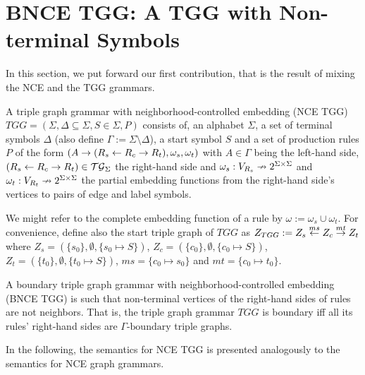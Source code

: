 \documentclass[runningheads]{llncs}
\begin{document}
\section{BNCE TGG: A TGG with Non-terminal Symbols}
\label{sec:bncetgg}
In this section, we put forward our first contribution, that is the result of mixing the NCE and the TGG grammars.

\begin{definition}
	A triple graph grammar with neighborhood-controlled embedding (NCE TGG) $TGG = (\Sigma, \Delta \subseteq \Sigma, S \in \Sigma, P)$ consists of, an alphabet $\Sigma$, a set of terminal symbols $\Delta$ (also define $\Gamma := \Sigma \setminus \Delta$), a start symbol $S$ and a set of production rules $P$ of the form $(A \to (R_s \overset{}{\leftarrow} R_c \overset{}{\rightarrow} R_t), \omega_s, \omega_t)$ with $A \in \Gamma$ being the left-hand side, $(R_s \overset{}{\leftarrow} R_c \overset{}{\rightarrow} R_t) \in \mathcal{TG}_{\Sigma}$ the right-hand side and $\omega_s : V_{R_s} \nrightarrow 2^{\Sigma \times \Sigma}$ and $\omega_t : V_{R_t} \nrightarrow 2^{\Sigma \times \Sigma}$ the partial embedding functions from the right-hand side's vertices to pairs of edge and label symbols.
\end{definition}

We might refer to the complete embedding function of a rule by $\omega:= \omega_s \cup \omega_t$. For convenience, define also the start triple graph of $TGG$ as $Z_{TGG} := Z_s \overset{ms}{\leftarrow} Z_c \overset{mt}{\rightarrow} Z_t$ where $Z_s = (\{s_0\},\emptyset,\{s_0 \mapsto S\})$, $Z_c = (\{c_0\},\emptyset,\{c_0 \mapsto S\})$, $Z_t = (\{t_0\},\emptyset,\{t_0 \mapsto S\})$, $ms = \{c_0 \mapsto s_0 \}$ and $mt = \{c_0 \mapsto t_0 \}$.
	

\begin{definition}
	A boundary triple graph grammar with neighborhood-controlled embedding (BNCE TGG) is such that non-terminal vertices of the right-hand sides of rules are not neighbors. That is, the triple graph grammar $TGG$ is boundary iff all its rules' right-hand sides are $\Gamma\text{-boundary}$ triple graphs.
\end{definition}


In the following, the semantics for NCE TGG is presented analogously to the semantics for NCE graph grammars.
\end{document}
